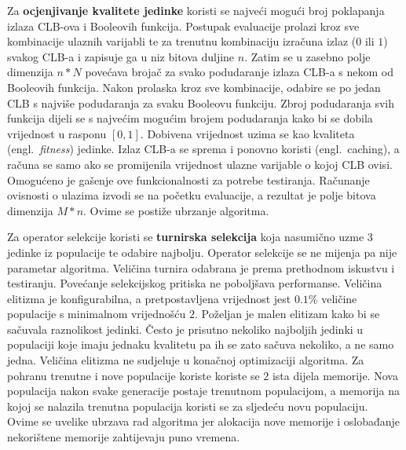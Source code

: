 \documentclass[times, utf8, diplomski]{fer}
\begin{document}
Za \textbf{ocjenjivanje kvalitete jedinke} koristi se najveći mogući broj poklapanja izlaza CLB-ova i Booleovih funkcija. Postupak evaluacije prolazi kroz sve kombinacije ulaznih varijabli te za trenutnu kombinaciju izračuna izlaz ($0$ ili $1$) svakog CLB-a i zapisuje ga u niz bitova duljine $n$. Zatim se u zasebno polje dimenzija $n*N$ povećava brojač za svako podudaranje izlaza CLB-a s nekom od Booleovih funkcija. Nakon prolaska kroz sve kombinacije, odabire se po jedan CLB s najviše podudaranja za svaku Booleovu funkciju. Zbroj podudaranja svih funkcija dijeli se s najvećim mogućim brojem podudaranja kako bi se dobila vrijednost u rasponu $[0, 1]$. Dobivena vrijednost uzima se kao kvaliteta (engl.~\textit{fitness}) jedinke. Izlaz CLB-a se sprema i ponovno koristi (engl.~caching), a računa se samo ako se promijenila vrijednost ulazne varijable o kojoj CLB ovisi. Omogućeno je gašenje ove funkcionalnosti za potrebe testiranja. Računanje ovisnosti o ulazima izvodi se na početku evaluacije, a rezultat je polje bitova dimenzija $M*n$. Ovime se postiže ubrzanje algoritma.

Za operator selekcije koristi se \textbf{turnirska selekcija} koja nasumično uzme $3$ jedinke iz populacije te odabire najbolju. Operator selekcije se ne mijenja pa nije parametar algoritma. Veličina turnira odabrana je prema prethodnom iskustvu i testiranju. Povećanje selekcijskog pritiska ne poboljšava performanse. Veličina elitizma je konfigurabilna, a pretpostavljena vrijednost jest $0.1\%$ veličine populacije s minimalnom vrijednošću $2$. Poželjan je malen elitizam kako bi se sačuvala raznolikost jedinki. Često je prisutno nekoliko najboljih jedinki u populaciji koje imaju jednaku kvalitetu pa ih se zato sačuva nekoliko, a ne samo jedna. Veličina elitizma ne sudjeluje u konačnoj optimizaciji algoritma. Za pohranu trenutne i nove populacije koriste koriste se $2$ ista dijela memorije. Nova populacija nakon svake generacije postaje trenutnom populacijom, a memorija na kojoj se nalazila trenutna populacija koristi se za sljedeću novu populaciju. Ovime se uvelike ubrzava rad algoritma jer alokacija nove memorije i oslobađanje nekorištene memorije zahtijevaju puno vremena.
\end{document}
